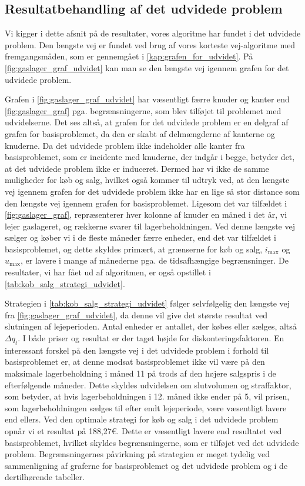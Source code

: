 \subsection{Resultatbehandling af det udvidede problem} \label{kap:resultat_udvidet}

Vi kigger i dette afsnit på de resultater, vores algoritme har fundet i det udvidede problem. Den længste vej er fundet ved brug af vores korteste vej-algoritme med fremgangsmåden, som er gennemgået i \autoref{kap:grafen_for_udvidet}. På \autoref{fig:gaslager_graf_udvidet} kan man se den længste vej igennem grafen for det udvidede problem.

Grafen i \autoref{fig:gaslager_graf_udvidet} har væsentligt færre knuder og kanter end \autoref{fig:gaslager_graf} pga. begrænsningerne, som blev tilføjet til problemet med udvidelserne. Det ses altså, at grafen for det udvidede problem er en delgraf af grafen for basisproblemet, da den er skabt af delmængderne af kanterne og knuderne. 
Da det udvidede problem ikke indeholder alle kanter fra basisproblemet, som er incidente med knuderne, der indgår i begge, betyder det, at det udvidede problem ikke er induceret. Dermed har vi ikke de samme muligheder for køb og salg, hvilket også kommer til udtryk ved, at den længste vej igennem grafen for det udvidede problem ikke har en lige så stor distance som den længste vej igennem grafen for basisproblemet. Ligesom det var tilfældet i \autoref{fig:gaslager_graf}, repræsenterer hver kolonne af knuder en måned i det år, vi lejer gaslageret, og rækkerne svarer til lagerbeholdningen. Ved denne længste vej sælger og køber vi i de fleste måneder færre enheder, end det var tilfældet i basisproblemet, og dette skyldes primært, at grænserne for køb og salg, $i_{\max}$ og $u_{\max}$, er lavere i mange af månederne pga. de tidsafhængige begrænsninger. 
De resultater, vi har fået ud af algoritmen, er også opstillet i \autoref{tab:kob_salg_strategi_udvidet}. 

Strategien i \autoref{tab:kob_salg_strategi_udvidet} følger selvfølgelig den længste vej fra \autoref{fig:gaslager_graf_udvidet}, da denne vil give det største resultat ved slutningen af lejeperioden. Antal enheder er antallet, der købes eller sælges, altså $\Delta q_t$. I både priser og resultat er der taget højde for diskonteringsfaktoren. En interessant forskel på den længste vej i det udvidede problem i forhold til basisproblemet er, at denne modsat basisproblemet ikke vil være på den maksimale lagerbeholdning i måned 11 på trods af den højere salgspris i de efterfølgende måneder. Dette skyldes udvidelsen om slutvolumen og straffaktor, som betyder, at hvis lagerbeholdningen i 12. måned ikke ender på 5, vil prisen, som lagerbeholdningen sælges til efter endt lejeperiode, være væsentligt lavere end ellers. 
Ved den optimale strategi for køb og salg i det udvidede problem opnår vi et resultat på 188,27€. Dette er væsentligt lavere end resultatet ved basisproblemet, hvilket skyldes begrænsningerne, som er tilføjet ved det udvidede problem. Begrænsningernes påvirkning på strategien er meget tydelig ved sammenligning af graferne for basisproblemet og det udvidede problem og i de dertilhørende tabeller. 